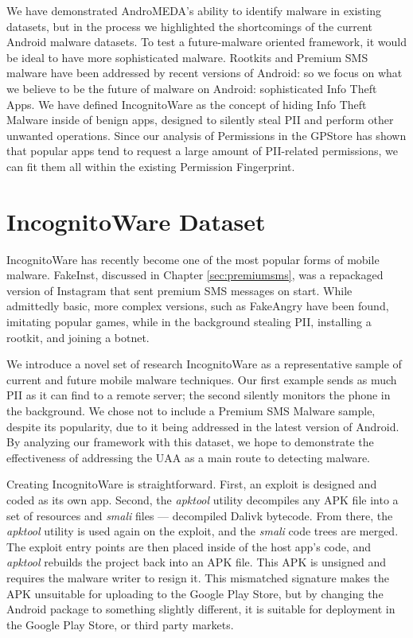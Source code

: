 We have demonstrated AndroMEDA's ability to identify malware in existing datasets, but in the process we highlighted the shortcomings of the current Android malware datasets. To test a future-malware oriented framework, it would be ideal to have more sophisticated malware. Rootkits and Premium SMS malware have been addressed by recent versions of Android: so we focus on what we believe to be the future of malware on Android: sophisticated Info Theft Apps. We have defined IncognitoWare as the concept of hiding Info Theft Malware inside of benign apps, designed to silently steal PII and perform other unwanted operations. Since our analysis of Permissions in the GPStore has shown that popular apps tend to request a large amount of PII-related permissions, we can fit them all within the existing Permission Fingerprint. 

\section{IncognitoWare Dataset}
\label{sec:incognitoware}
IncognitoWare has recently become one of the most popular forms of mobile malware\citep{nq2013}. FakeInst, discussed in Chapter \ref{sec:premiumsms}, was a repackaged version of Instagram\citep{instagramandroid} that sent premium SMS messages on start. While admittedly basic, more complex versions, such as FakeAngry\citep{fakeangry} have been found, imitating popular games, while in the background stealing PII, installing a rootkit, and joining a botnet.

We introduce a novel set of research IncognitoWare as a representative sample of current and future mobile malware techniques. Our first example sends as much PII as it can find to a remote server; the second silently monitors the phone in the background. We chose not to include a Premium SMS Malware sample, despite its popularity\citep{nq2013}, due to it being addressed in the latest version of Android. By analyzing our framework with this dataset, we hope to demonstrate the effectiveness of addressing the UAA as a main route to detecting malware.

Creating IncognitoWare is straightforward. First, an exploit is designed and coded as its own app. Second, the \textit{apktool}\citep{apktool} utility decompiles any APK file into a set of resources and \textit{smali} files --- decompiled Dalivk bytecode. From there, the \textit{apktool} utility is used again on the exploit, and the \textit{smali} code trees are merged. The exploit entry points are then placed inside of the host app's code, and \textit{apktool} rebuilds the project back into an APK file. This APK is unsigned and requires the malware writer to resign it. This mismatched signature makes the APK unsuitable for uploading to the Google Play Store, but by changing the Android package to something slightly different, it is suitable for deployment in the Google Play Store, or third party markets.


